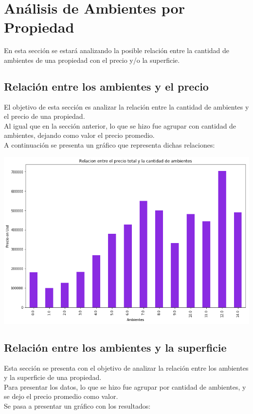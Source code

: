 \documentclass[a4paper, 10pt]{article}
\begin{document}
		
		\section{Análisis de Ambientes por Propiedad}
				
			En esta sección se estará analizando la posible relación entre la cantidad de ambientes de una propiedad con el precio y/o la superficie.			
				
				\subsection{Relación entre los ambientes y el precio}
					El objetivo de esta sección es analizar la relación entre la cantidad de ambientes y el precio de una propiedad.
					\\
					Al igual que en la sección anterior, lo que se hizo fue agrupar con cantidad de ambientes, dejando como valor el precio promedio.
					\\
					A continuación se presenta un gráfico que representa dichas relaciones:
				
					\begin{center}    		
    					\includegraphics[width=\textwidth]{images/RelAmbPrec}    				
					\end{center}
				
				\subsection{Relación entre los ambientes y la superficie}
					Esta sección se presenta con el objetivo de analizar la relación entre los ambientes y la superficie de una propiedad.
					\\
					Para presentar los datos, lo que se hizo fue agrupar por cantidad de ambientes, y se dejo el precio promedio como valor.
					\\
					Se pasa a presentar un gráfico con los resultados:
					
\end{document}
